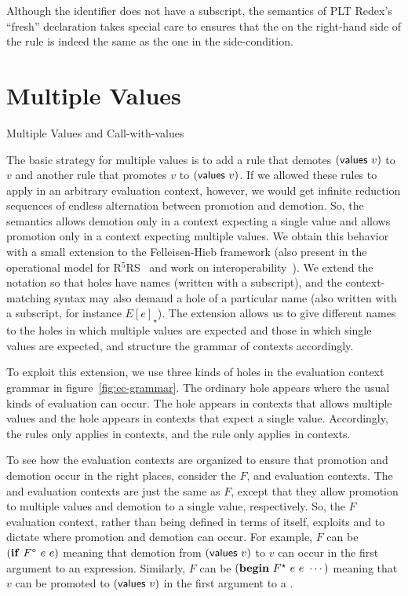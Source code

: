 Although the identifier  does not have a subscript, the semantics of PLT Redex's ``fresh'' declaration takes special care to ensures that the  on the right-hand side of the rule is indeed the same as the one in the side-condition.

\section{Multiple Values}

\beginfig
\begin{center}

\end{center}
\caption{Multiple Values and Call-with-values}\label{fig:multiple-values-and-call-with-values}
\endfig

The basic strategy for multiple values is to add a rule that demotes
$(\textnormal{\textsf{values}}~v)$ to $v$ and another rule that promotes
$v$ to $(\textnormal{\textsf{values}}~v)$. If we allowed these rules to apply
in an arbitrary evaluation context, however, we would get infinite
reduction sequences of endless alternation between promotion and
demotion. So, the semantics allows demotion only in a context
expecting a single value and allows promotion only in a context
expecting multiple values. We obtain this behavior with a small
extension to the Felleisen-Hieb framework (also present in the
operational model for R$^5$RS~\cite{mf:op-r5rs} and work on
interoperability~\cite{mf:interop}). We extend the notation so that
holes have names (written with a subscript), and the context-matching
syntax may also demand a hole of a particular name (also written with
a subscript, for instance $E[e]_{\star}$).  The extension
allows us to give different names to the holes in which multiple
values are expected and those in which single values are expected, and
structure the grammar of contexts accordingly.

To exploit this extension, we use three kinds of holes in the
evaluation context grammar in figure~\ref{fig:ec-grammar}. The
ordinary hole \hole{} appears where the usual kinds of
evaluation can occur. The hole \holes{} appears in contexts that
allows multiple values and the hole \holeone{} appears in
contexts that expect a single value. Accordingly, the rules
 only applies in \holes{} contexts, and the
rule  only applies in \holeone{} contexts.

To see how the evaluation contexts are organized to ensure that
promotion and demotion occur in the right places, consider the $F$,
\Fstar{} and \Fo{} evaluation contexts. The \Fstar{} and \Fo{}
evaluation contexts are just the same as $F$, except that they allow
promotion to multiple values and demotion to a single value,
respectively. So, the $F$ evaluation context, rather than being
defined in terms of itself, exploits \Fstar{} and \Fo{} to dictate
where promotion and demotion can occur. For example, $F$ can be
$(\textnormal{\textbf{if}}~F^{\circ}{}~e~e)$ meaning that demotion from $(\textnormal{\textsf{values}}~v)$ to
$v$ can occur in the first argument to an  expression.
Similarly, $F$ can be $(\textnormal{\textbf{begin}}~F^{\star}{}~e~e~\cdots)$ meaning that
$v$ can be promoted to $(\textnormal{\textsf{values}}~v)$ in the first argument to a
.

